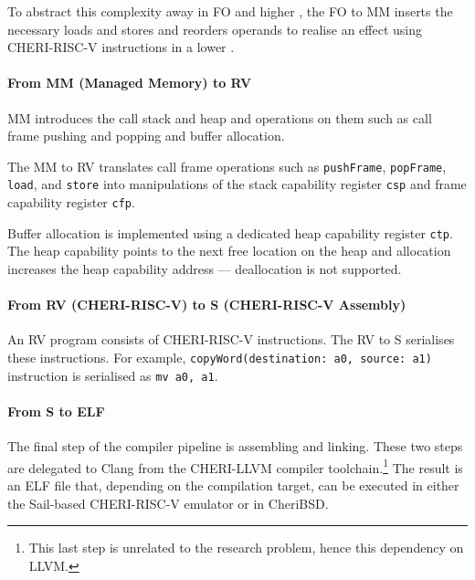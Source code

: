 \documentclass[main.tex]{subfiles}
\begin{document}
To abstract this complexity away in FO and higher , the FO to MM  inserts the necessary loads and stores and reorders operands to realise an effect using CHERI-RISC-V instructions in a lower .

\paragraph{From MM (Managed Memory) to RV} MM introduces the call stack and heap and operations on them such as call frame pushing and popping and buffer allocation.

The MM to RV  translates call frame operations such as \texttt{pushFrame}, \texttt{popFrame}, \texttt{load}, and \texttt{store} into manipulations of the stack capability register \texttt{csp} and frame capability register \texttt{cfp}.

Buffer allocation is implemented using a dedicated heap capability register \texttt{ctp}. The heap capability points to the next free location on the heap and allocation increases the heap capability address — deallocation is not supported.

\paragraph{From RV (CHERI-RISC-V) to S (CHERI-RISC-V Assembly)} An RV program consists of CHERI-RISC-V instructions. The RV to S  serialises these instructions. For example, \texttt{copyWord(destination: a0, source: a1)} instruction is serialised as \hbox{\texttt{mv a0, a1}}.

\paragraph{From S to ELF} The final step of the compiler pipeline is assembling and linking. These two steps are delegated to Clang from the CHERI-LLVM compiler toolchain.\footnote{This last step is unrelated to the research problem, hence this dependency on LLVM.} The result is an ELF file that, depending on the compilation target, can be executed in either the Sail-based CHERI-RISC-V emulator or in CheriBSD.

\biblio{}
\onlyinsubfile{\glsaddall\printglossaries}
\end{document}
